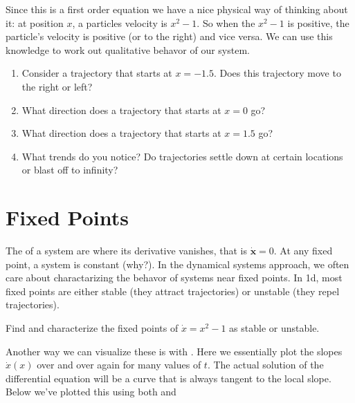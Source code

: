 \documentclass[letterpaper,10pt,english]{jupyterBook}
\begin{document}
\sphinxAtStartPar
Since this is a first order equation we have a nice physical way of thinking about it: at position \(x\), a particles velocity is \(x^2 -1\). So when the \(x^2-1\) is positive, the particle’s velocity is positive (or to the right) and vice versa. We can use this knowledge to work out qualitative behavor of our system.

\sphinxAtStartPar
{}
\begin{enumerate}
%
\item {} 
\sphinxAtStartPar
Consider a trajectory that starts at \(x = -1.5\). Does this trajectory move to the right or left?

\item {} 
\sphinxAtStartPar
What direction does a trajectory that starts at \(x = 0\) go?

\item {} 
\sphinxAtStartPar
What direction does a trajectory that starts at \( x = 1.5\) go?

\item {} 
\sphinxAtStartPar
What trends do you notice? Do trajectories settle down at certain locations or blast off to infinity?

\end{enumerate}


\section{Fixed Points}
\label{\detokenize{content/1_mechanics/dynamical_1:fixed-points}}
\sphinxAtStartPar
The  of a system are where its derivative vanishes, that is \(\dot{\mathbf{x}} = 0\). At any fixed point, a system is constant (why?). In the dynamical systems approach, we often care about charactarizing the behavor of systems near fixed points. In 1d, most fixed points are either stable (they attract trajectories) or unstable (they repel trajectories).

\sphinxAtStartPar
{}

\sphinxAtStartPar
Find and characterize the fixed points of \(\dot{x} = x^2-1\) as stable or unstable.

\sphinxAtStartPar
Another way we can visualize these is with . Here we essentially plot the slopes \(\dot{x}(x)\) over and over again for many values of \(t\). The actual solution of the differential equation will be a curve that is always tangent to the local slope. Below we’ve plotted this using both  and 
\end{document}
